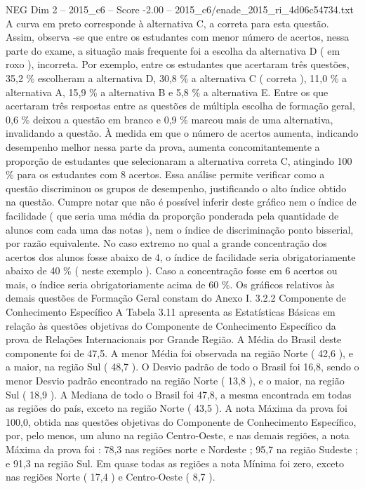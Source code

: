 \begin{textsample}{NEG Dim 2 – 2015\_c6 – Score -2.00 – 2015\_c6/enade\_2015\_ri\_4d06c54734.txt}
A curva em preto corresponde à alternativa C, a correta para esta questão.
Assim, observa -se que entre os estudantes com menor número de acertos, nessa parte do exame, a situação mais frequente foi a escolha da alternativa D ( em roxo ), incorreta.
Por exemplo, entre os estudantes que acertaram três questões, 35,2 \% escolheram a alternativa D, 30,8 \% a alternativa C ( correta ), 11,0 \% a alternativa A, 15,9 \% a alternativa B e 5,8 \% a alternativa E.
Entre os que acertaram três respostas entre as questões de múltipla escolha de formação geral, 0,6 \% deixou a questão em branco e 0,9 \% marcou mais de uma alternativa, invalidando a questão.
À medida em que o número de acertos aumenta, indicando desempenho melhor nessa parte da prova, aumenta concomitantemente a proporção de estudantes que selecionaram a alternativa correta C, atingindo 100 \% para os estudantes com 8 acertos.
Essa análise permite verificar como a questão discriminou os grupos de desempenho, justificando o alto índice obtido na questão.
Cumpre notar que não é possível inferir deste gráfico nem o índice de facilidade ( que seria uma média da proporção ponderada pela quantidade de alunos com cada uma das notas ), nem o índice de discriminação ponto bisserial, por razão equivalente.
No caso extremo no qual a grande concentração dos acertos dos alunos fosse abaixo de 4, o índice de facilidade seria obrigatoriamente abaixo de 40 \% ( neste exemplo ).
Caso a concentração fosse em 6 acertos ou mais, o índice seria obrigatoriamente acima de 60 \%.
Os gráficos relativos às demais questões de Formação Geral constam do Anexo I. 3.2.2 Componente de Conhecimento Específico A Tabela 3.11 apresenta as Estatísticas Básicas em relação às questões objetivas do Componente de Conhecimento Específico da prova de Relações Internacionais por Grande Região.
A Média do Brasil deste componente foi de 47,5.
A menor Média foi observada na região Norte ( 42,6 ), e a maior, na região Sul ( 48,7 ).
O Desvio padrão de todo o Brasil foi 16,8, sendo o menor Desvio padrão encontrado na região Norte ( 13,8 ), e o maior, na região Sul ( 18,9 ).
A Mediana de todo o Brasil foi 47,8, a mesma encontrada em todas as regiões do país, exceto na região Norte ( 43,5 ).
A nota Máxima da prova foi 100,0, obtida nas questões objetivas do Componente de Conhecimento Específico, por, pelo menos, um aluno na região Centro-Oeste, e nas demais regiões, a nota Máxima da prova foi : 78,3 nas regiões norte e Nordeste ; 95,7 na região Sudeste ; e 91,3 na região Sul.
Em quase todas as regiões a nota Mínima foi zero, exceto nas regiões Norte ( 17,4 ) e Centro-Oeste ( 8,7 ).

\end{textsample}
